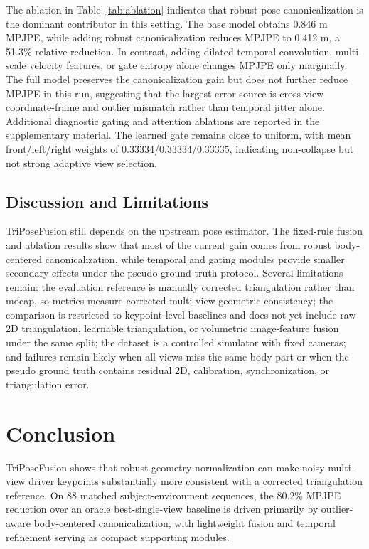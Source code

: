 \documentclass[runningheads]{llncs}
\begin{document}
The ablation in Table~\ref{tab:ablation} indicates that robust pose canonicalization is the dominant contributor in this setting. The base model obtains 0.846 m MPJPE, while adding robust canonicalization reduces MPJPE to 0.412 m, a 51.3\% relative reduction. In contrast, adding dilated temporal convolution, multi-scale velocity features, or gate entropy alone changes MPJPE only marginally. The full model preserves the canonicalization gain but does not further reduce MPJPE in this run, suggesting that the largest error source is cross-view coordinate-frame and outlier mismatch rather than temporal jitter alone. Additional diagnostic gating and attention ablations are reported in the supplementary material. The learned gate remains close to uniform, with mean front/left/right weights of 0.33334/0.33334/0.33335, indicating non-collapse but not strong adaptive view selection.

\subsection{Discussion and Limitations}
TriPoseFusion still depends on the upstream pose estimator. The fixed-rule fusion and ablation results show that most of the current gain comes from robust body-centered canonicalization, while temporal and gating modules provide smaller secondary effects under the pseudo-ground-truth protocol. Several limitations remain: the evaluation reference is manually corrected triangulation rather than mocap, so metrics measure corrected multi-view geometric consistency; the comparison is restricted to keypoint-level baselines and does not yet include raw 2D triangulation, learnable triangulation, or volumetric image-feature fusion under the same split; the dataset is a controlled simulator with fixed cameras; and failures remain likely when all views miss the same body part or when the pseudo ground truth contains residual 2D, calibration, synchronization, or triangulation error.

\section{Conclusion}
TriPoseFusion shows that robust geometry normalization can make noisy multi-view driver keypoints substantially more consistent with a corrected triangulation reference. On 88 matched subject-environment sequences, the 80.2\% MPJPE reduction over an oracle best-single-view baseline is driven primarily by outlier-aware body-centered canonicalization, with lightweight fusion and temporal refinement serving as compact supporting modules.



\end{document}
